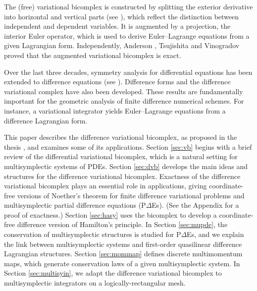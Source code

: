 \documentclass[11pt]{article} %
\numberwithin{equation}{section}
\theoremstyle{plain}
\theoremstyle{definition}
\begin{document}
The (free) variational bicomplex is constructed by splitting the exterior
derivative into horizontal and vertical parts (see \cite{Vi2001,KrVi1999,Vi1984,An1992,An1989}), which reflect the distinction between independent and dependent variables. It is augmented by a projection, the interior Euler operator, which is used to derive Euler--Lagrange equations from a given Lagrangian form. Independently, Anderson \cite{An1992,An1989}, Tsujishita \cite{Ts1982} and Vinogradov \cite{Vi2001,Vi1984} proved that the augmented variational bicomplex is exact.

Over the last three decades, symmetry analysis for differential equations has been extended to difference equations (see \cite{Do2001,Do2010,Hy2005,RaHy2007,PH2022,Xe2018,Hy2014,LeTrWi2000,Pe2013,Pe2017}).
Difference forms \cite{MaHy2008} and the difference variational complex
\cite{HyMa2004} have also been developed. These results are
fundamentally important for the geometric analysis of finite difference numerical schemes. For instance, a variational integrator yields Euler--Lagrange equations from a difference Lagrangian form.

This paper describes the difference variational bicomplex, as proposed in the thesis \cite{Pe2013},  and examines some of its applications. Section \ref{sec:vb} begins with a brief review of the differential variational bicomplex, which is a natural setting for multisymplectic systems of PDEs. Section \ref{sec:dvb} develops the main ideas and structures for the difference variational bicomplex. Exactness of the difference variational bicomplex plays an essential role in applications, giving coordinate-free versions of Noether's theorem  for finite difference variational problems and multisymplectic partial difference equations (P$\Delta$Es). (See the Appendix for a proof of exactness.) Section \ref{sec:hasy} uses the bicomplex to develop a coordinate-free difference version of Hamilton's
principle. In Section \ref{sec:mupde}, the
conservation of multisymplectic structures is studied for P$\Delta$Es, and we explain the link between multisymplectic systems and first-order quasilinear difference Lagrangian structures. Section \ref{sec:mommap} defines discrete
multimomentum maps, which generate conservation laws of a given multisymplectic system. In Section \ref{sec:multisyin}, we adapt the difference variational bicomplex to multisymplectic integrators on a logically-rectangular mesh.
\end{document}

